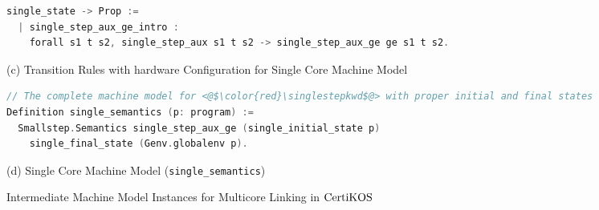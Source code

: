 \begin{figure}
\begin{lstlisting}[language=C]
  single_state -> Prop :=
  | single_step_aux_ge_intro : 
    forall s1 t s2, single_step_aux s1 t s2 -> single_step_aux_ge ge s1 t s2.
\end{lstlisting}
\begin{center}
(c) Transition Rules with hardware Configuration for Single Core Machine Model
\end{center}
\begin{lstlisting}[language=C, deletekeywords={int}]    
// The complete machine model for <@$\color{red}\singlestepkwd$@> with proper initial and final states
Definition single_semantics (p: program) :=
  Smallstep.Semantics single_step_aux_ge (single_initial_state p) 
    single_final_state (Genv.globalenv p).
\end{lstlisting}
\begin{center}
(d) Single Core Machine Model (\lstinline$single_semantics$)
\end{center}
\caption{Intermediate Machine Model Instances for Multicore Linking in $\mathrm{CertiKOS}$}
\label{fig:chapter:certikos:multicore-machine-model-instances}
\end{figure}


